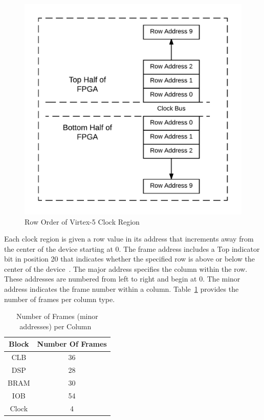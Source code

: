 \begin{figure}[h]
\centering
\includegraphics[width=.7\linewidth]{Figures/RowOrder}
\caption[Row Order of Virtex-5 Clock Region]{Row Order of Virtex-5 Clock Region}
\label{fig:RowOrder}
\end{figure}
Each clock region is given a row value in its address that increments away from the center of the device starting at 0. 
The frame address includes a Top indicator bit in position 20 that indicates whether the specified row is above or below the center of the device~\cite{virtex5ConfigGuide}.
The major address specifies the column within the row.
These addresses are numbered from left to right and begin at 0.
The minor address indicates the frame number within a column. 
Table~\ref{tbl:minorAddressNumbers} provides the number of frames per column type.
\begin{table}[h!]
	\centering
	\caption{Number of Frames (minor addresses) per Column~\cite{virtex5ConfigGuide}}
	\label{tbl:minorAddressNumbers}
	\begin{tabular}{|c|c|}
		\hline
		Block             & Number Of Frames \\ \hline
		CLB               & 36               \\ \hline
		DSP               & 28               \\ \hline
		\acrshort{BRAM}   & 30               \\ \hline
		IOB               & 54               \\ \hline
		Clock             & 4                \\ \hline
	\end{tabular}
\end{table}
